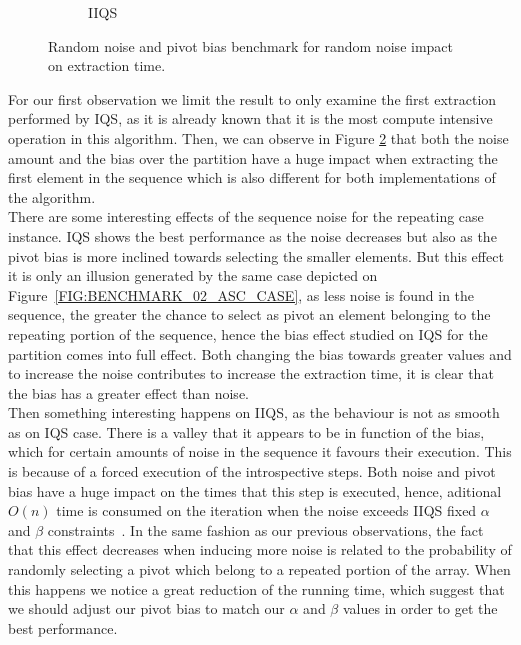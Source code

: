 \begin{figure}
\begin{subfigure}[b]{0.45\textwidth}
        \caption{IIQS}
        \label{FIG:BENCHMARK_06_NOISE_BIAS__0_1}
    \end{subfigure}

    \caption{Random noise and pivot bias benchmark for random noise impact on extraction time.}
    \label{FIG:BENCHMARK_06_NOISE_BIAS}
\end{figure}

For our first observation we limit the result to only examine the first extraction performed by IQS, as it is already known that it is the most compute intensive operation in this algorithm. Then, we can observe in Figure \ref{FIG:BENCHMARK_06_NOISE_BIAS} that both the noise amount and the bias over the partition have a huge impact when extracting the first element in the sequence which is also different for both implementations of the algorithm.\\

There are some interesting effects of the sequence noise for the repeating case instance. IQS shows the best performance as the noise decreases but also as the pivot bias is more inclined towards selecting the smaller elements. But this effect it is only an illusion generated by the same case depicted on Figure~\ref{FIG:BENCHMARK_02_ASC_CASE}, as less noise is found in the sequence, the greater the chance to select as pivot an element belonging to the repeating portion of the sequence, hence the bias effect studied on IQS for the partition comes into full effect. Both changing the bias towards greater values and to increase the noise contributes to increase the extraction time, it is clear that the bias has a greater effect than noise. \\

Then something interesting happens on IIQS, as the behaviour is not as smooth as on IQS case. There is a valley that it appears to be in function of the bias, which for certain amounts of noise in the sequence it favours their execution. This is because of a forced execution of the introspective steps. Both noise and pivot bias have a huge impact on the times that this step is executed, hence, aditional $O(n)$ time is consumed on the iteration when the noise exceeds IIQS fixed $\alpha$ and $\beta$ constraints~\cite{7416566}. In the same fashion as our previous observations, the fact that this effect decreases when inducing more noise is related to the probability of randomly selecting a pivot which belong to a repeated portion of the array. When this happens we notice a great reduction of the running time, which suggest that we should adjust our pivot bias to match our $\alpha$ and $\beta$ values in order to get the best performance.\\


